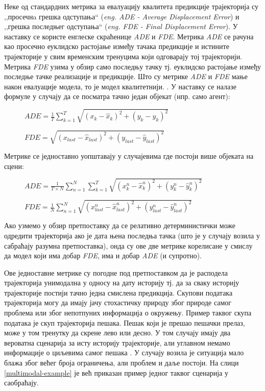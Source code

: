 \documentclass[11pt,oneside]{memoir}
\begin{document}
Неке од стандардних метрика за евалуацију квалитета предикције трајекторија су ,,просечнa грешка одступања`` (\textit{eng. ADE - Average Displacement Error})
и ,,грешка последњег одступања`` (\textit{eng. FDE - Final Displacement Error}). У наставку се користе енглеске скраћенице \textit{ADE} и
\textit{FDE}. Метрика \textit{ADE} се рачуна као просечно еуклидско растојање између тачака предикције и истините трајекторије у свим
временским тренуцима који одговарају тој трајекторији. 
Метрика \textit{FDE} узима у обзир само последњу тачку тј. еуклидско растојање између последње тачке реализације и предикције.
Што су метрике \textit{ADE} и \textit{FDE} мање након евалуације модела, то је модел квалитетнији. \cite{social_gan, argoverse}.  
У наставку се налазе формуле у случају да се посматра тачно један објекат (нпр. само агент):

\begin{figure}[H]
  \centering
  $ADE = \frac{1}{T}\sum_{k=1}^{T}\sqrt{(x_k - \hat{x}_k)^2 + (y_k - \hat{y}_k)^2}$
\end{figure}

\begin{figure}[H]
  \centering
  $FDE = \sqrt{(x_{last} - \hat{x}_{last})^2 + (y_{last} - \hat{y}_{last})^2}$
\end{figure}

Метрике се једноставно уопштавају у случајевима где постоји више објеката на сцени:

\begin{figure}[H]
  \centering
  $ADE = \frac{1}{T\times N}\sum_{n=1}^{N}\sum_{k=1}^{T}\sqrt{(x^n_k - \hat{x}^n_k)^2 + (y^n_k - \hat{y}^n_k)^2}$
\end{figure}

\begin{figure}[H]
  \centering
  $FDE = \frac{1}{N}\sum_{n=1}^{N}\sqrt{(x^n_{last} - \hat{x}^n_{last})^2 + (y^n_{last} - \hat{y}^n_{last})^2}$
\end{figure}

Ако узмемо у обзир претпоставку да се релативно детерминистички може одредити трајекторија ако је дата њена последња тачка 
(што је у случају возила у сабраћају разумна претпоставка), онда су ове две метрике корелисане у смислу да модел 
који има добар \textit{FDE}, има и добар \textit{ADE} (и супротно).

Ове једноставне метрике су погодне под претпоставком да је расподела трајекторија унимодална у односу на дату историју тј. да за сваку историју трајекторије 
постији тачно једна смислена предикција. 
Скупови података трајекторија могу да имају јачу стохастичку природу због природе самог проблема или због непотпуних информација о окружењу.
Пример таквог скупа података је скуп трајекторија пешака. Пешак који је прешао пешачки прелаз, може у том тренутку да скрене лево или десно.
У том случају имају два вероватна сценарија за исту историју трајекторије, али углавном немамо информације о циљевима самог пешака \cite{social_gan, best_of_many_cvae}. 
У случају возила је ситуација мало блажа због већег броја ограничења, али проблем и даље постоји. На слици \ref{multimodal-example} је већ приказан пример једног 
таквог сценарија у саобраћају.
\end{document}
